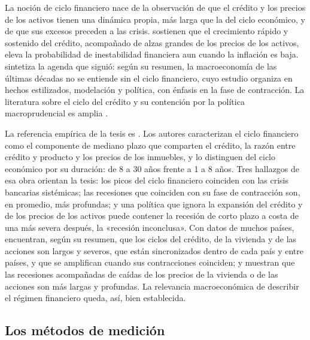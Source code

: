 La noción de ciclo financiero nace de la observación de que el crédito y los precios de los
activos tienen una dinámica propia, más larga que la del ciclo económico, y de que sus excesos
preceden a las crisis. \textcite{borio_lowe_2002} sostienen que el crecimiento rápido y sostenido
del crédito, acompañado de alzas grandes de los precios de los activos, eleva la probabilidad de
inestabilidad financiera aun cuando la inflación es baja. \textcite{borio_2014} sintetiza la
agenda que siguió: según su resumen, la macroeconomía de las últimas décadas no se entiende sin el
ciclo financiero, cuyo estudio organiza en hechos estilizados, modelación y política, con énfasis
en la fase de contracción. La literatura sobre el ciclo del crédito y su contención por la
política macroprudencial es amplia \parencite[por ejemplo,][]{aikman_haldane_nelson_2015}.

La referencia empírica de la tesis es \textcite{drehmann_borio_tsatsaronis_2012}. Los autores
caracterizan el ciclo financiero como el componente de mediano plazo que comparten el crédito,
la razón entre crédito y producto y los precios de los inmuebles, y lo distinguen del ciclo
económico por su duración: de 8 a 30 años frente a 1 a 8 años. Tres hallazgos de esa obra orientan
la tesis: los picos del ciclo financiero coinciden con las crisis bancarias sistémicas; las
recesiones que coinciden con su fase de contracción son, en promedio, más profundas; y una
política que ignora la expansión del crédito y de los precios de los activos puede contener la
recesión de corto plazo a costa de una más severa después, la «recesión inconclusa». Con datos de
muchos países, \textcite{claessens_kose_terrones_2011} encuentran, según su resumen, que los
ciclos del crédito, de la vivienda y de las acciones son largos y severos, que están sincronizados
dentro de cada país y entre países, y que se amplifican cuando sus contracciones coinciden; y
\textcite{claessens_kose_terrones_2012} muestran que las recesiones acompañadas de caídas de los
precios de la vivienda o de las acciones son más largas y profundas. La relevancia macroeconómica
de describir el régimen financiero queda, así, bien establecida.

\subsection{Los métodos de medición}

